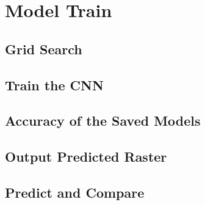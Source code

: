 \section{Model Train}\label{app.model_train}
\subsection{Grid Search}\label{app.grid_seacrh}



\subsection{Train the CNN}\label{app.train_cnn}



\subsection{Accuracy of the Saved Models}\label{app.accuracy}


\subsection{Output Predicted Raster}\label{app.pred_raster}


\subsection{Predict and Compare}\label{app.pred_compare}



